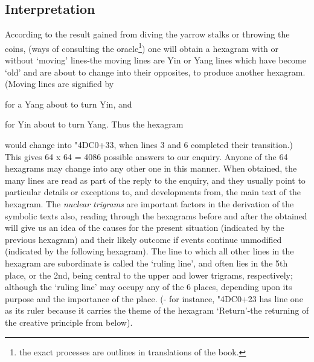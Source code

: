 \documentclass[11pt]{book}
\newcommand{\iching}[1]{{\dejavusanszh\char\numexpr"4DC0+#1}}
\begin{document}
\hypertarget{interpretation}{%
\subsection{Interpretation}\label{interpretation}}

According to the result gained from diving the yarrow stalks or throwing the coins, (ways of consulting the oracle\footnote{the exact processes are outlines in translations of the book.}) one will obtain a hexagram with or without `moving' lines-the moving lines are Yin or Yang lines which have become `old' and are about to change into their opposites, to produce another hexagram. (Moving lines are signified by  for a Yang about to turn Yin, and  for Yin about to turn Yang. Thus the hexagram  would change into \iching{33}, when lines 3 and 6 completed their transition.) This gives 64 x 64 = 4086 possible answers to our enquiry. Anyone of the 64 hexagrams may change into any other one in this manner. When obtained, the many lines are read as part of the reply to the enquiry, and they usually point to particular details or exceptions to, and developments from, the main text of the hexagram. The \emph{nuclear trigrams} are important factors in the derivation of the symbolic texts also, reading through the hexagrams before and after the obtained will give us an idea of the causes for the present situation (indicated by the previous hexagram) and their likely outcome if events continue unmodified (indicated by the following hexagram). The line to which all other lines in the hexagram are subordinate is called the `ruling line', and often lies in the 5th place, or the 2nd, being central to the upper and lower trigrams, respectively; although the `ruling line' may occupy any of the 6 places, depending upon its purpose and the importance of the place. (- for instance, \iching{23} has line one as its ruler because it carries the theme of the hexagram `Return'-the returning of the creative principle from below).
\end{document}
